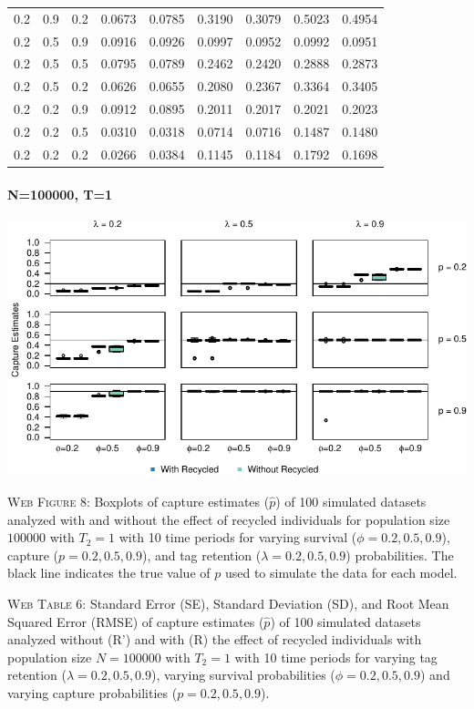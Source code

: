 \documentclass[]{article}
\let\oldparagraph\paragraph
\renewcommand{\paragraph}[1]{\oldparagraph{#1}\mbox{}}
\begin{document}
\begin{table}[ht]
{\begin{tabular}{rrrrrrrrr}
  0.2 & 0.9 & 0.2 & 0.0673 & 0.0785 & 0.3190 & 0.3079 & 0.5023 & 0.4954 \\ 
  0.2 & 0.5 & 0.9 & 0.0916 & 0.0926 & 0.0997 & 0.0952 & 0.0992 & 0.0951 \\ 
  0.2 & 0.5 & 0.5 & 0.0795 & 0.0789 & 0.2462 & 0.2420 & 0.2888 & 0.2873 \\ 
  0.2 & 0.5 & 0.2 & 0.0626 & 0.0655 & 0.2080 & 0.2367 & 0.3364 & 0.3405 \\ 
  0.2 & 0.2 & 0.9 & 0.0912 & 0.0895 & 0.2011 & 0.2017 & 0.2021 & 0.2023 \\ 
  0.2 & 0.2 & 0.5 & 0.0310 & 0.0318 & 0.0714 & 0.0716 & 0.1487 & 0.1480 \\ 
  0.2 & 0.2 & 0.2 & 0.0266 & 0.0384 & 0.1145 & 0.1184 & 0.1792 & 0.1698 \\ 
   \hline
\end{tabular}
}
\endgroup
\end{table}

\newpage

\paragraph{N=100000, T=1}\label{n100000-t1-1}

\includegraphics{Appendix_files/figure-latex/8_capture_GJSTL2-1.pdf}

\textsc{Web Figure 8:} Boxplots of capture estimates (\(\hat{p}\)) of
100 simulated datasets analyzed with and without the effect of recycled
individuals for population size \(100000\) with \(T_2=1\) with 10 time
periods for varying survival (\(\phi=0.2,0.5,0.9\)), capture
(\(p=0.2,0.5,0.9\)), and tag retention (\(\lambda=0.2,0.5,0.9\))
probabilities. The black line indicates the true value of \(p\) used to
simulate the data for each model.

\textsc{Web Table 6:} Standard Error (SE), Standard Deviation (SD), and
Root Mean Squared Error (RMSE) of capture estimates (\(\hat{p}\)) of 100
simulated datasets analyzed without (R') and with (R) the effect of
recycled individuals with population size \(N=100000\) with \(T_2=1\)
with 10 time periods for varying tag retention
(\(\lambda=0.2,0.5,0.9\)), varying survival probabilities
(\(\phi=0.2,0.5,0.9\)) and varying capture probabilities
(\(p=0.2,0.5,0.9\)).
\end{document}
